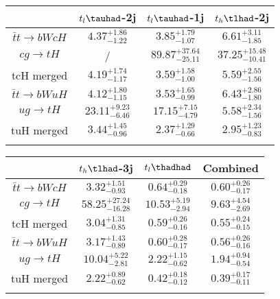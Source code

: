 \centering
\begin{tabular}{|cccc} \toprule\toprule
 & $t_l\tauhad$-2j & $t_l\tauhad$-1j & $t_h\tlhad$-2j\\\midrule
$\bar{t}t\to bWcH$ & $4.37^{+1.86}_{-1.22}$ & $3.85^{+1.79}_{-1.07}$ & $6.61^{+3.11}_{-1.85}$\\
$cg\to tH$ &  / & $89.87^{+37.64}_{-25.11}$ & $37.25^{+15.48}_{-10.41}$\\
tcH merged & $4.19^{+1.74}_{-1.17}$ & $3.59^{+1.58}_{-1.00}$ & $5.59^{+2.55}_{-1.56}$\\
$\bar{t}t\to bWuH$ & $4.12^{+1.80}_{-1.15}$ & $3.53^{+1.65}_{-0.99}$ & $6.43^{+2.86}_{-1.80}$\\
$ug\to tH$ & $23.11^{+9.23}_{-6.46}$ & $17.15^{+7.15}_{-4.79}$ & $5.58^{+2.34}_{-1.56}$\\
tuH merged & $3.44^{+1.45}_{-0.96}$ & $2.37^{+1.29}_{-0.66}$ & $2.95^{+1.23}_{-0.83}$\\
\bottomrule\bottomrule\\
\end{tabular}
\begin{tabular}{|cccc} \toprule\toprule
 & $t_h\tlhad$-3j & $t_l\thadhad$ & Combined\\\midrule
$\bar{t}t\to bWcH$ & $3.32^{+1.51}_{-0.93}$ & $0.64^{+0.29}_{-0.18}$ & $0.60^{+0.26}_{-0.17}$\\
$cg\to tH$ & $58.25^{+27.24}_{-16.28}$ & $10.53^{+5.19}_{-2.94}$ & $9.63^{+4.54}_{-2.69}$\\
tcH merged & $3.04^{+1.31}_{-0.85}$ & $0.59^{+0.26}_{-0.16}$ & $0.55^{+0.24}_{-0.15}$\\
$\bar{t}t\to bWuH$ & $3.17^{+1.43}_{-0.89}$ & $0.60^{+0.28}_{-0.17}$ & $0.56^{+0.26}_{-0.16}$\\
$ug\to tH$ & $10.04^{+5.22}_{-2.81}$ & $2.22^{+1.15}_{-0.62}$ & $1.94^{+0.94}_{-0.54}$\\
tuH merged & $2.22^{+0.89}_{-0.62}$ & $0.42^{+0.18}_{-0.12}$ & $0.39^{+0.17}_{-0.11}$\\
\bottomrule\bottomrule\\
\end{tabular}
